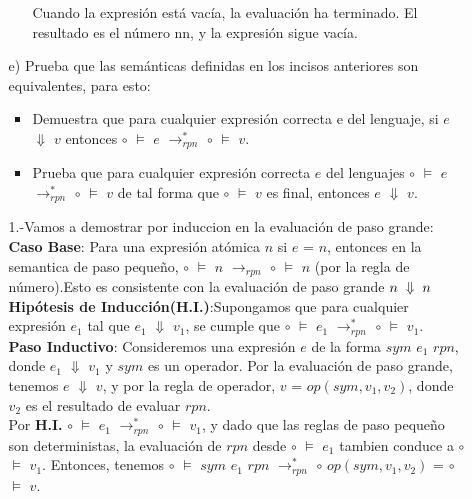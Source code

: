\documentclass{article}
\begin{document}
\begin{enumerate}
\begin{itemize}
\begin{enumerate}
                Cuando la expresión está vacía, la evaluación ha terminado. El resultado es el número nn, y la expresión sigue vacía.\\
            \end{enumerate}
            
            \item[e)] Prueba que las semánticas definidas en los incisos anteriores son equivalentes, para esto:\\

            \begin{itemize}
                \item Demuestra que para cualquier expresión correcta e del lenguaje, si $e$ $\Downarrow$ $v$ entonces $\circ$ $\models$ $e$ $\rightarrow^{*}_{rpn}$ $\circ$ $\models$  $v$.\\

                \item Prueba que para cualquier expresión correcta $e$ del lenguajes $\circ$ $\models$ $e$ $\rightarrow^{*}_{rpn}$ $\circ$ $\models$  $v$ de tal forma que $\circ$ $\models$ $v$ es final, entonces $e$ $\Downarrow$ $v$.
            \end{itemize}

            1.-Vamos a demostrar por induccion en la evaluación de paso grande:\\

            \textbf{Caso Base}: Para una expresión atómica $n$ si $e$ = $n$, entonces en la semantica de paso pequeño, $\circ$ $\models$ $n$ $\rightarrow_{rpn}$ $\circ$ $\models$ $n$ (por la regla de número).Esto es consistente con la evaluación de paso grande $n\hspace{0.1cm}\Downarrow\hspace{0.1cm}n$\\

            \textbf{Hipótesis de Inducción(H.I.)}:Supongamos que para cualquier expresión $e_1$ tal que $e_1$ $\Downarrow$ $v_1$, se cumple que $\circ$ $\models$ $e_1$ $\rightarrow^{*}_{rpn}$ $\circ$ $\models$  $v_1$.\\

            \textbf{Paso Inductivo}: Consideremos una expresión $e$ de la forma $sym$ $e_1$ $rpn$, donde $e_1$ $\Downarrow$ $v_1$ y $sym$ es un operador. Por la evaluación de paso grande, tenemos $e$ $\Downarrow$ $v$, y por la regla de operador, $v$ = $op(sym,v_1,v_2)$, donde $v_2$ es el resultado de evaluar $rpn$.\\
            Por \textbf{H.I.} $\circ$ $\models$ $e_1$ $\rightarrow^{*}_{rpn}$ $\circ$ $\models$  $v_1$, y dado que las reglas de paso pequeño son deterministas, la evaluación de $rpn$ desde $\circ$ $\models$ $e_1$ tambien conduce a $\circ$ $\models$ $v_1$. Entonces, tenemos $\circ$ $\models$ $sym$ $e_1$ $rpn$ $\rightarrow^{*}_{rpn}$ $\circ$ $op(sym,v_1,v_2)$ = $\circ$ $\models$ $v$.\\


\end{itemize}
\end{enumerate}
\end{document}

